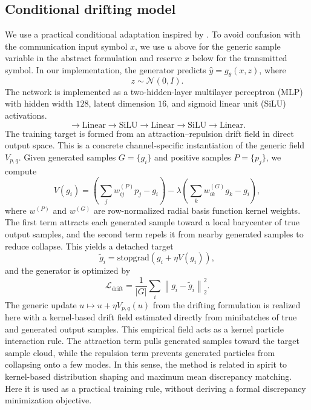 \documentclass[10pt,journal]{IEEEtran}
\begin{document}
\subsection{Conditional drifting model}
  We use a practical conditional adaptation inspired by \cite{drifting}.
  To avoid confusion with the communication input symbol \(x\), we use \(u\) above for the generic
  sample variable in the abstract formulation and reserve \(x\) below for the transmitted symbol.
  In our implementation, the generator predicts \(\hat y = g_\theta(x,z)\), where
  \begin{equation}
  z \sim \mathcal{N}(0, I).
  \end{equation}
  The network is implemented as a two-hidden-layer multilayer perceptron (MLP) with hidden
  width \(128\), latent dimension \(16\), and sigmoid linear unit (SiLU) activations.
\begin{equation}
[x, z]
\rightarrow
\mathrm{Linear}
\rightarrow
\mathrm{SiLU}
\rightarrow
\mathrm{Linear}
\rightarrow
\mathrm{SiLU}
\rightarrow
\mathrm{Linear}.
\end{equation}
The training target is formed from an attraction--repulsion drift field in direct output space. This is a concrete channel-specific instantiation of the generic field \(V_{p,q}\).
Given generated samples \(G = \{g_i\}\) and positive samples \(P = \{p_j\}\), we compute
\begin{equation}
V(g_i)
=
\left(
\sum_j w^{(P)}_{ij} p_j - g_i
\right)
-
\lambda
\left(
\sum_k w^{(G)}_{ik} g_k - g_i
\right),
\end{equation}
where \(w^{(P)}\) and \(w^{(G)}\) are row-normalized radial basis function kernel weights.
The first term attracts each generated sample toward a local barycenter of true output samples, and the second term repels it from nearby generated samples to reduce collapse.
This yields a detached target
\begin{equation}
\tilde{g}_i
=
\mathrm{stopgrad}\!\left(g_i + \eta V(g_i)\right),
\end{equation}
and the generator is optimized by
\begin{equation}
\mathcal{L}_{\text{drift}}
=
\frac{1}{|G|}
\sum_i
\left\|
g_i - \tilde{g}_i
\right\|_2^2.
\end{equation}
The generic update \(u \mapsto u + \eta V_{p,q}(u)\) from the drifting formulation is realized here with a kernel-based drift field estimated directly from minibatches of true and generated output samples.
This empirical field acts as a kernel particle interaction rule.
The attraction term pulls generated samples toward the target sample cloud, while the repulsion term prevents generated particles from collapsing onto a few modes.
In this sense, the method is related in spirit to kernel-based distribution shaping and maximum mean discrepancy matching.
Here it is used as a practical training rule, without deriving a formal discrepancy minimization objective.
\end{document}
